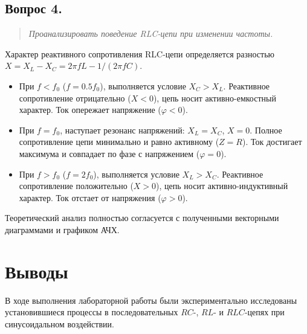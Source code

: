 \subsection*{Вопрос 4.}
\begin{quote}
    \textit{Проанализировать поведение RLC-цепи при изменении частоты.}
\end{quote}

Характер реактивного сопротивления RLC-цепи определяется разностью $X = X_L - X_C = 2\pi f L - 1/(2\pi f C)$.
\begin{itemize}
    \item При $f < f_0$ ($f=0.5f_0$), выполняется условие $X_C > X_L$. Реактивное сопротивление отрицательно ($X<0$), цепь носит активно-емкостный характер. Ток опережает напряжение ($\varphi < 0$).
    \item При $f = f_0$, наступает резонанс напряжений: $X_L = X_C$, $X=0$. Полное сопротивление цепи минимально и равно активному ($Z=R$). Ток достигает максимума и совпадает по фазе с напряжением ($\varphi = 0$).
    \item При $f > f_0$ ($f=2f_0$), выполняется условие $X_L > X_C$. Реактивное сопротивление положительно ($X>0$), цепь носит активно-индуктивный характер. Ток отстает от напряжения ($\varphi > 0$).
\end{itemize}
Теоретический анализ полностью согласуется с полученными векторными диаграммами и графиком АЧХ.


\section*{Выводы}
В ходе выполнения лабораторной работы были экспериментально исследованы установившиеся процессы в последовательных $RC$-, $RL$- и $RLC$-цепях при синусоидальном воздействии. 

